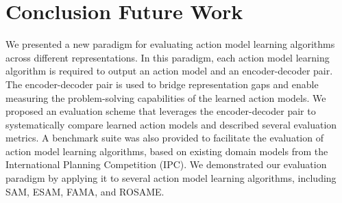 \documentclass{article}
\theoremstyle{definition}
\theoremstyle{remark}
\newif\ifaddcomments
\newcommand{\roni}[1]{\ifaddcomments{\textcolor{red}{[Roni: #1]}}\fi}
\begin{document}
\section{Conclusion Future Work}
\roni{I'll fix this text later}
We presented a new paradigm for evaluating action 
model learning algorithms across different representations. In this paradigm, each action model learning algorithm is required to output an action model and an encoder-decoder pair. The encoder-decoder pair is used to bridge representation gaps and enable measuring the problem-solving capabilities of the learned action models. We proposed an evaluation scheme that leverages the encoder-decoder pair to systematically compare learned action models and described several evaluation metrics. A benchmark suite was also provided to facilitate the evaluation of action model learning algorithms, based on existing domain models from the International Planning Competition (IPC). We demonstrated our evaluation paradigm by applying it to several action model learning algorithms, including SAM, ESAM, FAMA, and ROSAME.




 


\end{document}
